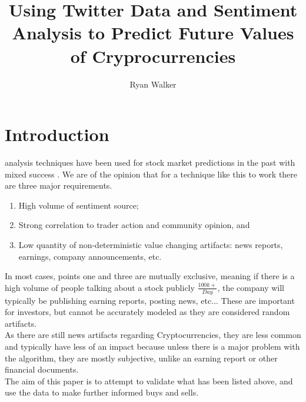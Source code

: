 \documentclass[12pt,journal,compsoc]{IEEEtran}
\begin{document}
\title{Using Twitter Data and Sentiment Analysis to Predict Future Values of Cryprocurrencies}

\author{Ryan Walker}


\maketitle
\IEEEpeerreviewmaketitle

\section{Introduction}
 analysis techniques have been used for stock market predictions in the past  with 
mixed success \cite{BI1}. We are of the opinion that for a technique like this to work there are three major requirements.

\begin{enumerate}
\item High volume of sentiment source;
\item Strong correlation to trader action and community opinion, and
\item Low quantity of non-deterministic value changing artifacts: news reports, earnings, company announcements, etc.
\end{enumerate}

In most cases, points one and three are mutually exclusive, meaning if there is a high volume of people talking about a
stock publicly $\frac{100k+}{Day}$, the company will typically be publishing earning reports, posting news, etc... 
These are important for investors, but cannot be accurately modeled as they are considered random artifacts.\\

As there are still news artifacts regarding Cryptocurrencies, they are less common and typically 
have less of an impact because unless there is a major problem with the algorithm, they are mostly subjective, unlike 
an earning report or other financial documents.\\

The aim of this paper is to attempt to validate what has been listed above, and use the data to make further informed 
buys and sells.
\end{document}
